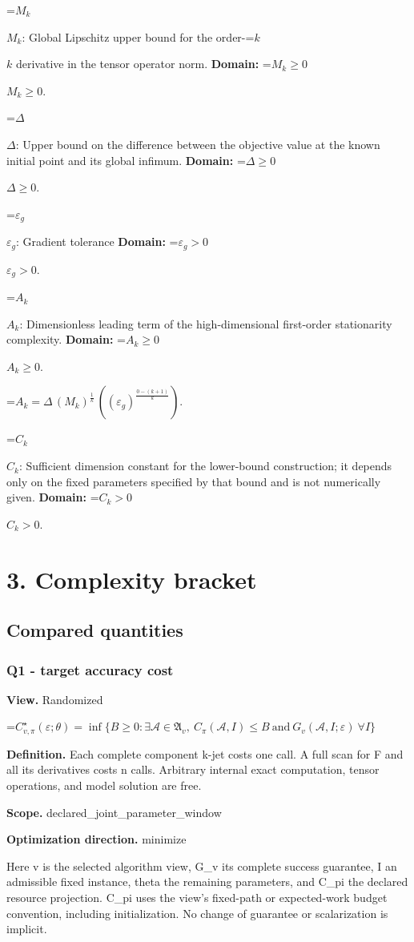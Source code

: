 \documentclass[10pt,a4paper]{article}
\newcommand{\AtlasMath}[1]{\par\begingroup\centering\setbox0=\hbox{$\displaystyle #1$}\ifdim\wd0>1.4\linewidth\typeout{ATLAS WIDE FORMULA: \the\wd0}\fi\ifdim\wd0>\linewidth\resizebox{\linewidth}{!}{\box0}\else\box0\fi\par\endgroup}
\newcommand{\AtlasInlineMath}[1]{\begingroup\setbox0=\hbox{$#1$}\ifdim\wd0>.4\linewidth\endgroup\AtlasMath{#1}\else\endgroup$#1$\fi}
\begin{document}
\AtlasInlineMath{M_k}: Global Lipschitz upper bound for the order-\AtlasInlineMath{k} derivative in the tensor operator norm. \textbf{Domain:} \AtlasInlineMath{M_k\ge0}.

\AtlasInlineMath{\Delta}: Upper bound on the difference between the objective value at the known initial point and its global infimum. \textbf{Domain:} \AtlasInlineMath{\Delta\ge0}.

\AtlasInlineMath{\varepsilon_g}: Gradient tolerance \textbf{Domain:} \AtlasInlineMath{\varepsilon_g>0}.

\AtlasInlineMath{A_k}: Dimensionless leading term of the high-dimensional first-order stationarity complexity. \textbf{Domain:} \AtlasInlineMath{A_k\ge0}.


\AtlasMath{A_k=\Delta\,(M_k)^{\frac{1}{k}}\,((\varepsilon_g)^{\frac{0-(k+1)}{k}}).}


\AtlasInlineMath{C_k}: Sufficient dimension constant for the lower-bound construction; it depends only on the fixed parameters specified by that bound and is not numerically given. \textbf{Domain:} \AtlasInlineMath{C_k>0}.

\section{3. Complexity bracket}
\subsection{Compared quantities}
\subsubsection{Q1 - target accuracy cost}
\textbf{View.} Randomized

\AtlasMath{C^\star_{v,\pi}(\varepsilon;\theta)=\inf\{B\ge0:\exists\mathcal A\in\mathfrak A_v,\ C_\pi(\mathcal A,I)\le B\ \text{and}\ G_v(\mathcal A,I;\varepsilon)\ \forall I\}}
\textbf{Definition.} Each complete component k-jet costs one call. A full scan for F and all its derivatives costs n calls. Arbitrary internal exact computation, tensor operations, and model solution are free.

\textbf{Scope.} declared\_joint\_parameter\_window

\textbf{Optimization direction.} minimize

Here v is the selected algorithm view, G\_v its complete success guarantee, I an admissible fixed instance, theta the remaining parameters, and C\_pi the declared resource projection. C\_pi uses the view's fixed-path or expected-work budget convention, including initialization. No change of guarantee or scalarization is implicit.
\end{document}
